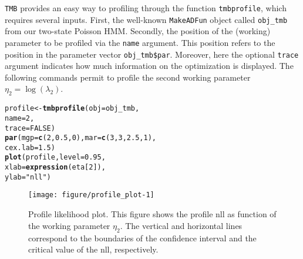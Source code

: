 \documentclass[bimj,fleqn]{w-art}\usepackage[]{graphicx}\usepackage[]{color}
\makeatletter
\def\maxwidth{ %
  \ifdim\Gin@nat@width>\linewidth
    \linewidth
  \else
    \Gin@nat@width
  \fi
}
\newcommand{\hlnum}[1]{\textcolor[rgb]{0.686,0.059,0.569}{#1}}%
\newcommand{\hlstr}[1]{\textcolor[rgb]{0.192,0.494,0.8}{#1}}%
\newcommand{\hlstd}[1]{\textcolor[rgb]{0.345,0.345,0.345}{#1}}%
\newcommand{\hlkwb}[1]{\textcolor[rgb]{0.69,0.353,0.396}{#1}}%
\newcommand{\hlkwc}[1]{\textcolor[rgb]{0.333,0.667,0.333}{#1}}%
\newcommand{\hlkwd}[1]{\textcolor[rgb]{0.737,0.353,0.396}{\textbf{#1}}}%
\newenvironment{kframe}{%
 \def\at@end@of@kframe{}%
 \ifinner\ifhmode%
  \def\at@end@of@kframe{\end{minipage}}%
  \begin{minipage}{\columnwidth}%
 \fi\fi%
 \def\FrameCommand##1{\hskip\@totalleftmargin \hskip-\fboxsep
 \colorbox{shadecolor}{##1}\hskip-\fboxsep
     \hskip-\linewidth \hskip-\@totalleftmargin \hskip\columnwidth}%
 \MakeFramed {\advance\hsize-\width
   \@totalleftmargin\z@ \linewidth\hsize
   \@setminipage}}%
 {\par\unskip\endMakeFramed%
 \at@end@of@kframe}
\newenvironment{knitrout}{}{} %
\theoremstyle{plain}
\theoremstyle{definition}
\makeatother
\begin{document}
{\tt{TMB}} provides an easy way to profiling through the function {\tt{tmbprofile}}, which requires several inputs.
First, the well-known \texttt{MakeADFun} object called \texttt{obj\_tmb} from our two-state Poisson HMM.
Secondly, the position of the (working) parameter to be profiled via the \texttt{name} argument.
This position refers to the position in the parameter vector \texttt{obj\_tmb\$par}.
Moreover, here the optional \texttt{trace} argument indicates how much information on the optimization is displayed.
The following commands permit to profile the second working parameter $\eta_2 = \log(\lambda_2)$. 
\begin{knitrout}
\color{fgcolor}\begin{kframe}
\begin{alltt}
\hlstd{profile} \hlkwb{<-} \hlkwd{tmbprofile}\hlstd{(}\hlkwc{obj} \hlstd{= obj_tmb,}
                      \hlkwc{name} \hlstd{=} \hlnum{2}\hlstd{,}
                      \hlkwc{trace} \hlstd{=} \hlnum{FALSE}\hlstd{)}
\hlkwd{par}\hlstd{(}\hlkwc{mgp} \hlstd{=} \hlkwd{c}\hlstd{(}\hlnum{2}\hlstd{,} \hlnum{0.5}\hlstd{,} \hlnum{0}\hlstd{),} \hlkwc{mar} \hlstd{=} \hlkwd{c}\hlstd{(}\hlnum{3}\hlstd{,} \hlnum{3}\hlstd{,} \hlnum{2.5}\hlstd{,} \hlnum{1}\hlstd{),}
    \hlkwc{cex.lab} \hlstd{=} \hlnum{1.5}\hlstd{)}
\hlkwd{plot}\hlstd{(profile,} \hlkwc{level} \hlstd{=} \hlnum{0.95}\hlstd{,}
     \hlkwc{xlab} \hlstd{=} \hlkwd{expression}\hlstd{(eta[}\hlnum{2}\hlstd{]),}
     \hlkwc{ylab} \hlstd{=} \hlstr{"nll"}\hlstd{)}
\end{alltt}
\end{kframe}\begin{figure}[htb]

{\centering \texttt{[image: figure/profile\_plot-1]} 

}

\caption[Profile likelihood plot]{Profile likelihood plot. This figure shows the profile nll as function of the working parameter $\eta_2$. The vertical and horizontal lines correspond to the boundaries of the confidence interval and the critical value of the nll, respectively.}\label{fig:profile_plot}
\end{figure}

\end{knitrout}
\end{document}
